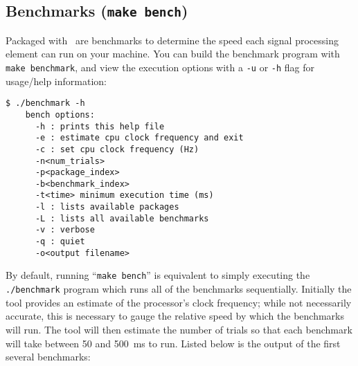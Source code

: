\subsection{Benchmarks ({\tt make bench})}
\label{section:installation:targets:benchmarks}
Packaged with \liquid\ are benchmarks to determine the speed each signal
processing element can run on your machine.
You can build the benchmark program with {\tt make benchmark}, and view
the execution options with a {\tt -u} or {\tt -h} flag for usage/help
information:
%
\begin{Verbatim}[fontsize=\small]
    $ ./benchmark -h
    bench options:
      -h : prints this help file
      -e : estimate cpu clock frequency and exit
      -c : set cpu clock frequency (Hz)
      -n<num_trials>
      -p<package_index>
      -b<benchmark_index>
      -t<time> minimum execution time (ms)
      -l : lists available packages
      -L : lists all available benchmarks
      -v : verbose
      -q : quiet
      -o<output filename>
\end{Verbatim}
%
By default, running ``{\tt make bench}'' is equivalent to simply
executing the {\tt ./benchmark} program which runs all of the benchmarks
sequentially.
Initially the tool provides an estimate of the processor's clock
frequency;
while not necessarily accurate, this is necessary to gauge the relative
speed by which the benchmarks will run.
The tool will then estimate the number of trials so that each benchmark
will take between 50 and 500~ms to run.
Listed below is the output of the first several benchmarks:
%
